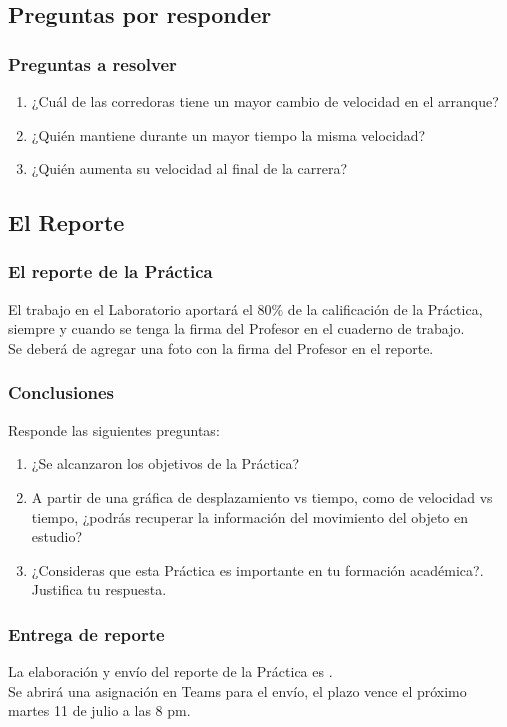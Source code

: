 \documentclass[14pt]{beamer}
\begin{document}
\subsection{Preguntas por responder}

\begin{frame}
\frametitle{Preguntas a resolver}
\begin{enumerate}[<+->]
\item ¿Cuál de las corredoras tiene un mayor cambio de velocidad en el arranque?
\item ¿Quién mantiene durante un mayor tiempo la misma velocidad?
\item ¿Quién aumenta su velocidad al final de la carrera?
\end{enumerate}
\end{frame}

\subsection{El Reporte}

\begin{frame}
\frametitle{El reporte de la Práctica}
El trabajo en el Laboratorio aportará el $80\%$ de la calificación de la Práctica, siempre y cuando se tenga la firma del Profesor en el cuaderno de trabajo.
\\
\bigskip
\pause
Se deberá de agregar una foto con la firma del Profesor en el reporte.
\end{frame}
\begin{frame}
\frametitle{Conclusiones}
Responde las siguientes preguntas:
\begin{enumerate}[<+->]
\item ¿Se alcanzaron los objetivos de la Práctica?
\item A partir de una gráfica de desplazamiento vs tiempo, como de velocidad vs tiempo, ¿podrás recuperar la información del movimiento del objeto en estudio?
\item ¿Consideras que esta Práctica es importante en tu formación académica?. Justifica tu respuesta.
\end{enumerate}
\end{frame}
\begin{frame}
\frametitle{Entrega de reporte}
La elaboración y envío del reporte de la Práctica es .
\\
\bigskip
\pause
Se abrirá una asignación en Teams para el envío, el plazo vence el próximo martes 11 de julio a las 8 pm.
\end{frame}
\end{document}
